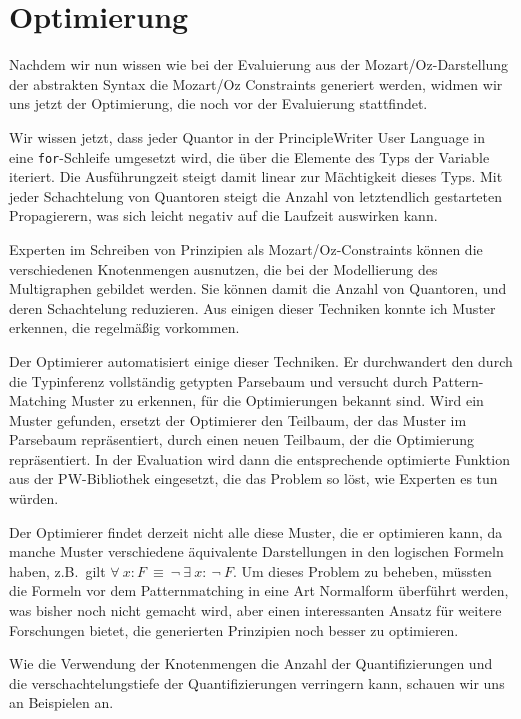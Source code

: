 \section{Optimierung}
Nachdem wir nun wissen wie bei der Evaluierung aus der
Mozart/Oz-Darstellung der abstrakten Syntax die Mozart/Oz Constraints
generiert werden, widmen wir uns jetzt der Optimierung, die noch vor
der Evaluierung stattfindet.

Wir wissen jetzt, dass jeder Quantor in der PrincipleWriter User
Language in eine {\tt for}-Schleife umgesetzt wird, die \"uber die
Elemente des Typs der Variable iteriert. Die Ausf\"uhrungzeit steigt
damit linear zur M\"achtigkeit dieses Typs.  Mit jeder Schachtelung
von Quantoren steigt die Anzahl von letztendlich gestarteten
Propagierern, was sich leicht negativ auf die Laufzeit auswirken kann.

Experten im Schreiben von Prinzipien als Mozart/Oz-Constraints
k\"onnen die verschiedenen Knotenmengen ausnutzen, die bei der
Modellierung des Multigraphen gebildet werden. Sie k\"onnen damit die
Anzahl von Quantoren, und deren Schachtelung reduzieren. Aus einigen
dieser Techniken konnte ich Muster erkennen, die regelm\"a{\ss}ig
vorkommen.

Der Optimierer automatisiert einige dieser Techniken.  Er durchwandert
den durch die Typinferenz vollst\"andig getypten Parsebaum und
versucht durch Pattern-Matching Muster zu erkennen, f\"ur die
Optimierungen bekannt sind. Wird ein Muster gefunden, ersetzt der
Optimierer den Teilbaum, der das Muster im Parsebaum repr\"asentiert,
durch einen neuen Teilbaum, der die Optimierung repr\"asentiert. In
der Evaluation wird dann die entsprechende optimierte Funktion aus der
PW-Bibliothek eingesetzt, die das Problem so l\"ost, wie Experten es
tun w\"urden.

Der Optimierer findet derzeit nicht alle diese Muster, die er
optimieren kann, da manche Muster verschiedene \"aquivalente
Darstellungen in den logischen Formeln haben, z.B.\ gilt
$\forall~x:F~\equiv~\neg~\exists~x:~\neg~F$. Um dieses Problem zu
beheben, m\"ussten die Formeln vor dem Patternmatching in eine Art
Normalform \"uberf\"uhrt werden, was bisher noch nicht gemacht wird,
aber einen interessanten Ansatz f\"ur weitere Forschungen bietet, die
generierten Prinzipien noch besser zu optimieren.

Wie die Verwendung der Knotenmengen die Anzahl der Quantifizierungen
und die verschachtelungstiefe der Quantifizierungen verringern kann,
schauen wir uns an Beispielen an.

